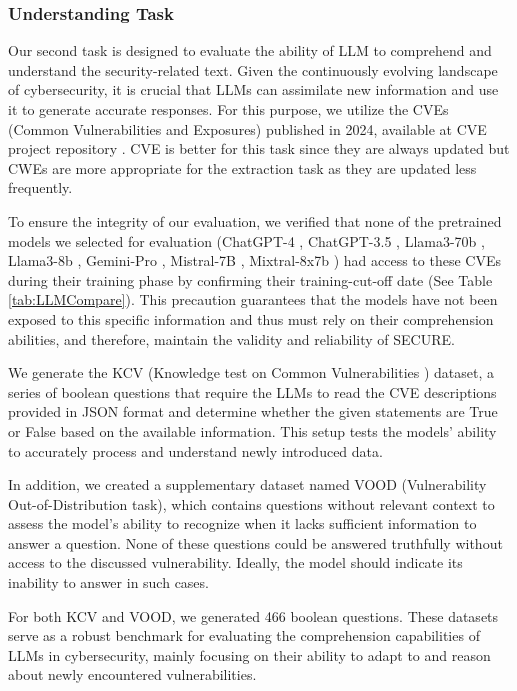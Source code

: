 \documentclass[conference]{IEEEtran}
\begin{document}
\subsubsection{Understanding Task}\label{sec:understandingtask}
Our second task is designed to evaluate the ability of LLM to comprehend and understand the security-related text. Given the continuously evolving landscape of cybersecurity, it is crucial that LLMs can assimilate new information and use it to generate accurate responses. For this purpose, we utilize the CVEs (Common Vulnerabilities and Exposures) published in 2024, available at CVE project repository \cite{cve2024}. CVE is better for this task since they are always updated but CWEs are more appropriate for the extraction task as they are updated less frequently.

To ensure the integrity of our evaluation, we verified that none of the pretrained models we selected for evaluation (ChatGPT-4 \cite{gpt4}, ChatGPT-3.5 \cite{gpt3.5}, Llama3-70b \cite{llama370b}, Llama3-8b \cite{llama38b}, Gemini-Pro \cite{gemini}, Mistral-7B \cite{jiang2023mistral} , Mixtral-8x7b \cite{mixtral8x7b}) had access to these CVEs during their training phase by confirming their training-cut-off date (See Table \ref{tab:LLMCompare}). This precaution guarantees that the models have not been exposed to this specific information and thus must rely on their comprehension abilities, and therefore, maintain the validity and reliability of SECURE.

We generate the KCV (Knowledge test on Common Vulnerabilities ) dataset, a series of boolean questions that require the LLMs to read the CVE descriptions provided in JSON format and determine whether the given statements are True or False based on the available information. This setup tests the models' ability to accurately process and understand newly introduced data.

In addition, we created a supplementary dataset named VOOD (Vulnerability Out-of-Distribution task), which contains questions without relevant context to assess the model's ability to recognize when it lacks sufficient information to answer a question. None of these questions could be answered truthfully without access to the discussed vulnerability. Ideally, the model should indicate its inability to answer in such cases.

For both KCV and VOOD, we generated 466 boolean questions. These datasets serve as a robust benchmark for evaluating the comprehension capabilities of LLMs in cybersecurity, mainly focusing on their ability to adapt to and reason about newly encountered vulnerabilities.
\end{document}
